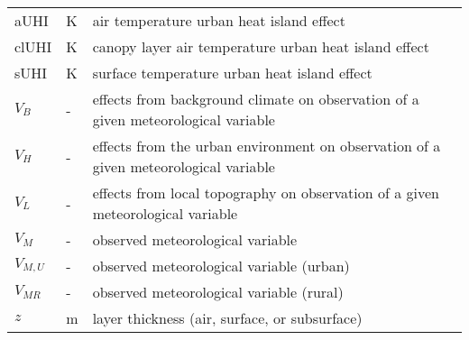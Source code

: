\begin{table}[H]
\begin{tabular}{p{1.5cm}p{2cm}p{10cm}}
		aUHI & \si{\kelvin} & air temperature urban heat island effect \\
		clUHI & \si{\kelvin} & canopy layer air temperature urban heat island effect \\
		sUHI & \si{\kelvin} & surface temperature urban heat island effect \\
		$V_B$ & - & effects from background climate on observation of a given meteorological variable \\
		$V_H$ & - & effects from the urban environment on observation of a given meteorological variable \\
		$V_L$ & - & effects from local topography on observation of a given meteorological variable \\
		$V_M$ & - & observed meteorological variable \\
		$V_{M, U} $ & - & observed meteorological variable (urban) \\
		$V_{M  R}$ & - & observed meteorological variable (rural) \\
		$z$ & \si{\meter} & layer thickness (air, surface, or subsurface)\\
		\bottomrule
	\end{tabular} 
\end{table}

